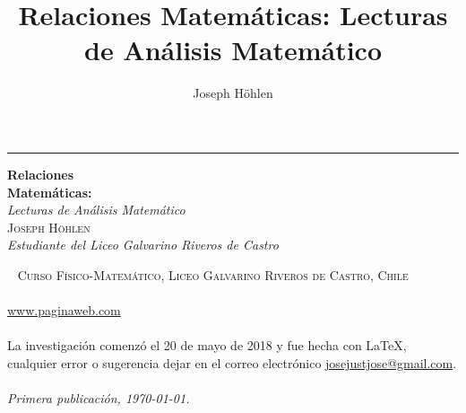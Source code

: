 \documentclass[11pt,oneside,a4paper]{book}
\title{Relaciones Matemáticas: Lecturas de Análisis Matemático}
\author{Joseph Höhlen}
\begin{document}


\frontmatter
\begin{titlepage}
	\raggedleft
	\rule{1pt}{\textheight}
	\hspace{0.05\textwidth}
	\parbox[b]{0.75\textwidth}{
		{\Huge\bfseries Relaciones\\[0.5\baselineskip]Matemáticas:}\\[2\baselineskip] %
		{\large\textit{Lecturas de Análisis Matemático}}\\[4\baselineskip] %
		{\Large\textsc{Joseph Höhlen}\\[0.5\baselineskip] \textit{Estudiante del Liceo Galvarino Riveros de Castro}} %
		\vspace{0.5\textheight}
	}
\end{titlepage}

\newpage
~\vfill
\thispagestyle{empty}
\noindent \textsc{Curso Físico-Matemático, Liceo Galvarino Riveros de Castro, Chile}\\\\
\url{www.paginaweb.com}\\\\
La investigación comenzó el 20 de mayo de 2018 y fue hecha con \LaTeX{}, cualquier error o sugerencia dejar en el correo electrónico \url{josejustjose@gmail.com}.\\\\
\textit{Primera publicación, \today{}.} 

\tableofcontents
\end{document}
